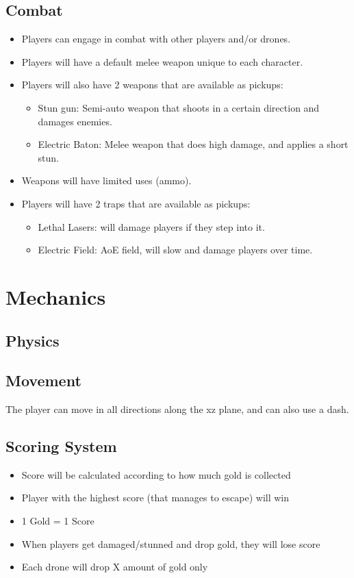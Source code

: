 \documentclass[14pt]{report}
\begin{document}
\subsection{Combat}
\begin{itemize}
    \item Players can engage in combat with other players and/or drones.
    \item Players will have a default melee weapon unique to each character.
    \item Players will also have 2 weapons that are available as pickups:
    \begin{itemize}
        \item Stun gun: Semi-auto weapon that shoots in a certain direction and damages enemies.
        \item Electric Baton: Melee weapon that does high damage, and applies a short stun.
    \end{itemize}
    \item Weapons will have limited uses (ammo).
    \item Players will have 2 traps that are available as pickups:
    \begin{itemize}
        \item Lethal Lasers: will damage players if they step into it.
        \item Electric Field: AoE field, will slow and damage players over time.
    \end{itemize}
\end{itemize}


\section{Mechanics}
\subsection{Physics}
\subsection{Movement}

The player can move in all directions along the xz plane, and can also use a dash.

\subsection{Scoring System}
\begin{itemize}
    \item Score will be calculated according to how much gold is collected
    \item Player with the highest score (that manages to escape) will win
    \item 1 Gold = 1 Score
    \item When players get damaged/stunned and drop gold, they will lose score
    \item Each drone will drop X amount of gold only
\end{itemize}
\end{document}
